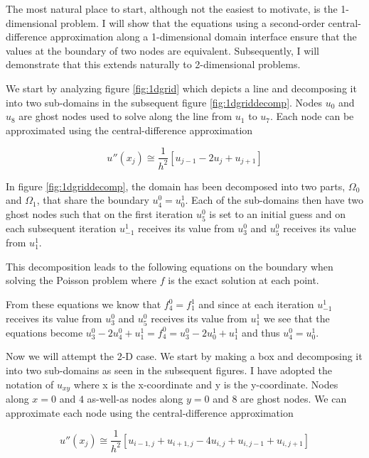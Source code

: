 The most natural place to start, although not the easiest to motivate, is the 1-dimensional problem. I will show that the equations using a second-order central-difference approximation along a 1-dimensional domain interface ensure that the values at the boundary of two nodes are equivalent. Subsequently, I will demonstrate that this extends naturally to 2-dimensional problems.

We start by analyzing figure \ref{fig:1dgrid} which depicts a line and decomposing it into two sub-domains in the subsequent figure \ref{fig:1dgriddecomp}. Nodes $u_0$ and $u_8$ are ghost nodes used to solve along the line from $u_1$ to $u_7$. Each node can be approximated using the central-difference approximation

\begin{equation}
	u''(x_{j}) \cong \frac{1}{h^2}[u_{j-1} - 2u_{j} + u_{j+1}]
\end{equation} 



In figure \ref{fig:1dgriddecomp}, the domain has been decomposed into two parts, $\Omega_0$ and $\Omega_1$, that share the boundary $u_4^0 = u_0^1$. Each of the sub-domains then have two ghost nodes such that on the first iteration $u_5^0$ is set to an initial guess and on each subsequent iteration $u_{-1}^1$ receives its value from $u_3^0$ and $u_5^0$ receives its value from $u_1^1$.


This decomposition leads to the following equations on the boundary when solving the Poisson problem where $f$ is the exact solution at each point.


From these equations we know that $f_4^0 = f_1^1$ and since at each iteration $u_{-1}^1$ receives its value from $u_3^0$ and $u_5^0$ receives its value from $u_1^1$ we see that the equations become $u_3^0 - 2u_4^0 + u_1^1 = f_4^0 = u_3^0 - 2u_0^1 + u_1^1$ and thus $u_4^0 = u_0^1$.

Now we will attempt the 2-D case. We start by making a box and decomposing it into two sub-domains as seen in the subsequent figures. I have adopted the notation of $u_{xy}$ where x is the x-coordinate and y is the y-coordinate. Nodes along $x = 0$ and $4$ as-well-as nodes along $y = 0$ and $8$ are ghost nodes. We can approximate each node using the central-difference approximation

\begin{equation}
	u''(x_{j}) \cong \frac{1}{h^2}[u_{i-1,j} + u_{i+1,j} - 4u_{i,j} + u_{i,j-1} + u_{i,j+1}]
\end{equation}

